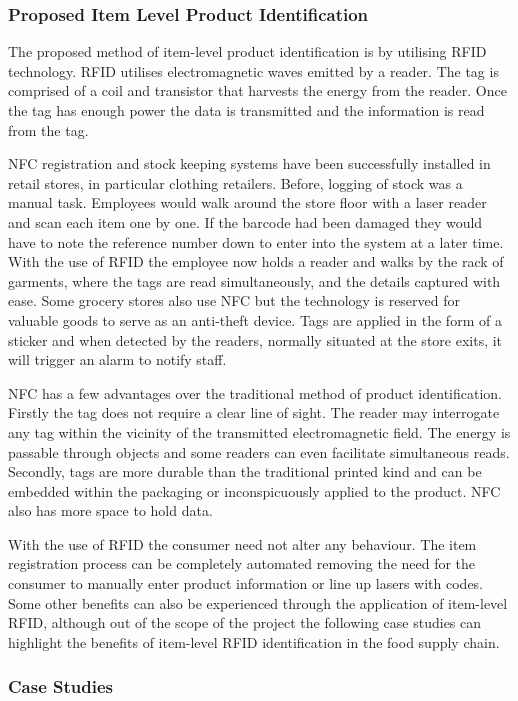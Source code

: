 \documentclass[a4paper, 11pt]{article}
\begin{document}
\subsubsection{Proposed Item Level Product Identification}
The proposed method of item-level product identification is by utilising RFID technology. RFID utilises electromagnetic waves emitted by a reader. The tag is comprised of a coil and transistor that harvests the energy from the reader. Once the tag has enough power the data is transmitted and the information is read from the tag. 

NFC registration and stock keeping systems have been successfully installed in retail stores, in particular clothing retailers. Before, logging of stock was a manual task. Employees would walk around the store floor with a laser reader and scan each item one by one. If the barcode had been damaged they would have to note the reference number down to enter into the system at a later time. With the use of RFID the employee now holds a reader and walks by the rack of garments, where the tags are read simultaneously, and the details captured with ease. Some grocery stores also use NFC but the technology is reserved for valuable goods to serve as an anti-theft device. Tags are applied in the form of a sticker and when detected by the readers, normally situated at the store exits, it will trigger an alarm to notify staff.

NFC has a few advantages over the traditional method of product identification. Firstly the tag does not require a clear line of sight. The reader may interrogate any tag within the vicinity of the transmitted electromagnetic field. The energy is passable through objects and some readers can even facilitate simultaneous reads. Secondly, tags are more durable than the traditional printed kind and can be embedded within the packaging or inconspicuously applied to the product. NFC also has more space to hold data.

With the use of RFID the consumer need not alter any behaviour. The item registration process can be completely automated removing the need for the consumer to manually enter product information or line up lasers with codes. Some other benefits can also be experienced through the application of item-level RFID, although out of the scope of the project the following case studies can highlight the benefits of item-level RFID identification in the food supply chain.

\subsubsection{Case Studies}
\end{document}
